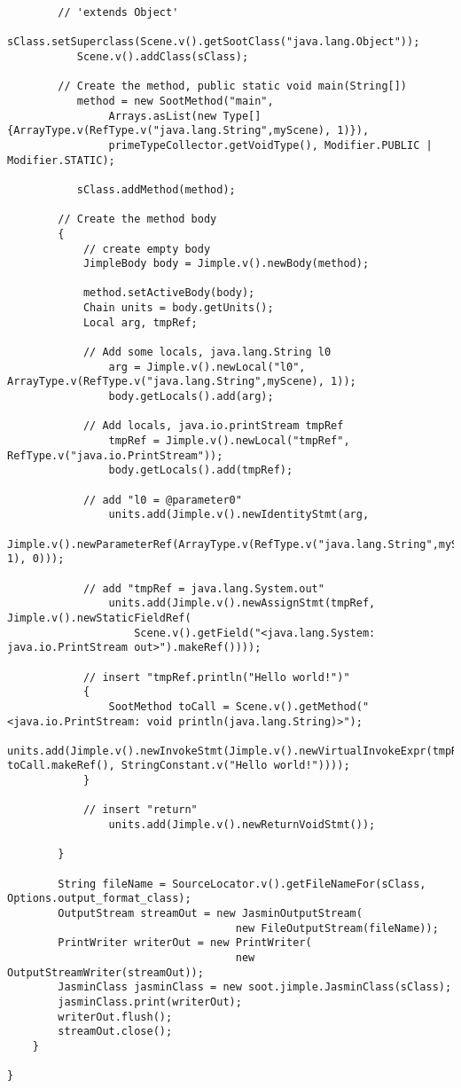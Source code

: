 \documentclass{article}
\begin{document}
\begin{verbatim}
        // 'extends Object'
           sClass.setSuperclass(Scene.v().getSootClass("java.lang.Object"));
           Scene.v().addClass(sClass);
           
        // Create the method, public static void main(String[])
           method = new SootMethod("main",
                Arrays.asList(new Type[] {ArrayType.v(RefType.v("java.lang.String",myScene), 1)}),
                primeTypeCollector.getVoidType(), Modifier.PUBLIC | Modifier.STATIC);
        
           sClass.addMethod(method);
           
        // Create the method body
        {
            // create empty body
            JimpleBody body = Jimple.v().newBody(method);
            
            method.setActiveBody(body);
            Chain units = body.getUnits();
            Local arg, tmpRef;
            
            // Add some locals, java.lang.String l0
                arg = Jimple.v().newLocal("l0", ArrayType.v(RefType.v("java.lang.String",myScene), 1));
                body.getLocals().add(arg);
            
            // Add locals, java.io.printStream tmpRef
                tmpRef = Jimple.v().newLocal("tmpRef", RefType.v("java.io.PrintStream"));
                body.getLocals().add(tmpRef);
                
            // add "l0 = @parameter0"
                units.add(Jimple.v().newIdentityStmt(arg, 
                     Jimple.v().newParameterRef(ArrayType.v(RefType.v("java.lang.String",myScene), 1), 0)));
            
            // add "tmpRef = java.lang.System.out"
                units.add(Jimple.v().newAssignStmt(tmpRef, Jimple.v().newStaticFieldRef(
                    Scene.v().getField("<java.lang.System: java.io.PrintStream out>").makeRef())));
            
            // insert "tmpRef.println("Hello world!")"
            {
                SootMethod toCall = Scene.v().getMethod("<java.io.PrintStream: void println(java.lang.String)>");
                units.add(Jimple.v().newInvokeStmt(Jimple.v().newVirtualInvokeExpr(tmpRef, toCall.makeRef(), StringConstant.v("Hello world!"))));
            }                        
            
            // insert "return"
                units.add(Jimple.v().newReturnVoidStmt());
                     
        }

        String fileName = SourceLocator.v().getFileNameFor(sClass, Options.output_format_class);
        OutputStream streamOut = new JasminOutputStream(
                                    new FileOutputStream(fileName));
        PrintWriter writerOut = new PrintWriter(
                                    new OutputStreamWriter(streamOut));
        JasminClass jasminClass = new soot.jimple.JasminClass(sClass);
        jasminClass.print(writerOut);
        writerOut.flush();
        streamOut.close();
    }
        
}
\end{verbatim}
\end{document}
